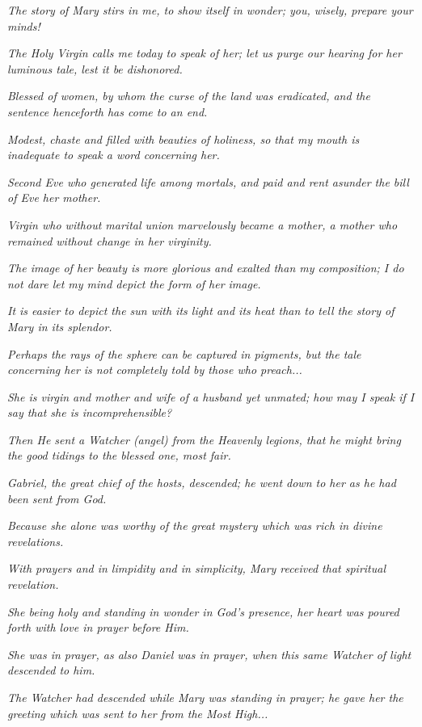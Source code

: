 \begin{quotex}
\emph{The story of Mary stirs in me, to show itself in wonder; you, wisely, prepare your minds!}

\emph{The Holy Virgin calls me today to speak of her; let us purge our hearing for her luminous tale, lest it be dishonored.}

\emph{Blessed of women, by whom the curse of the land was eradicated, and the sentence henceforth has come to an end.}

\emph{Modest, chaste and filled with beauties of holiness, so that my mouth is inadequate to speak a word concerning her.}

\emph{Second Eve who generated life among mortals, and paid and rent asunder the bill of Eve her mother.}

\emph{Virgin who without marital union marvelously became a mother, a mother who remained without change in her virginity.}

\emph{The image of her beauty is more glorious and exalted than my composition; I do not dare let my mind depict the form of her image.}

\emph{It is easier to depict the sun with its light and its heat than to tell the story of Mary in its splendor.}

\emph{Perhaps the rays of the sphere can be captured in pigments, but the tale concerning her is not completely told by those who preach... }

\emph{She is virgin and mother and wife of a husband yet unmated; how may I speak if I say that she is incomprehensible?}

\emph{Then He sent a Watcher (angel) from the Heavenly legions, that he might bring the good tidings to the blessed one, most fair.}

\emph{Gabriel, the great chief of the hosts, descended; he went down to her as he had been sent from God.}

\emph{Because she alone was worthy of the great mystery which was rich in divine revelations.}

\emph{With prayers and in limpidity and in simplicity, Mary received that spiritual revelation.}

\emph{She being holy and standing in wonder in God's presence, her heart was poured forth with love in prayer before Him.}

\emph{She was in prayer, as also Daniel was in prayer, when this same Watcher of light descended to him.}

\emph{The Watcher had descended while Mary was standing in prayer; he gave her the greeting which was sent to her from the Most High... }


\end{quotex}
